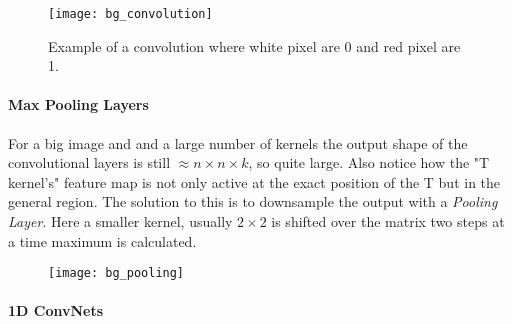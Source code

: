 \begin{figure}[H]
    \centering
    \texttt{[image: bg\_convolution]}
    \caption{Example of a convolution where white pixel are 0 and red pixel are 1.}
    \label{fig:bg:convolution}
\end{figure}

\paragraph{Max Pooling Layers}
For a big image and and a large number of kernels the output shape of the convolutional layers is still $\approx n \times n \times k$, so quite large. Also notice how the "T kernel's" feature map is not only active at the exact position of the T but in the general region. The solution to this is to downsample the output with a \textit{Pooling Layer}. Here a smaller kernel, usually $2 \times 2$ is shifted over the matrix two steps at a time maximum is calculated.

\begin{figure}[H]
    \centering
    \texttt{[image: bg\_pooling]}
    \caption{}
    \label{fig:bg:pooling}
\end{figure}


\paragraph{1D ConvNets}
